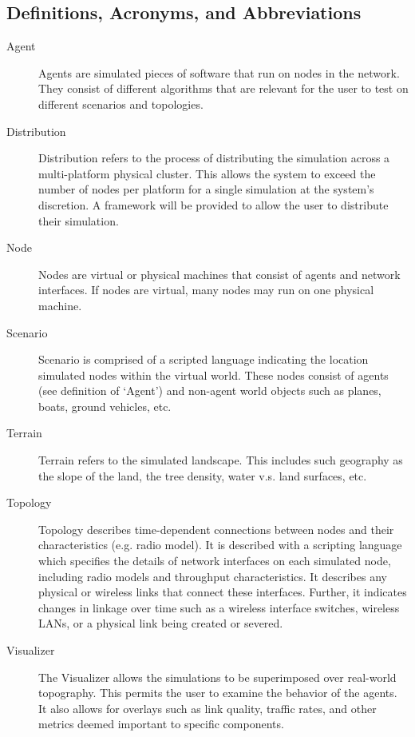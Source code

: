\documentclass[titlepage]{article}
\begin{document}
\subsection{Definitions, Acronyms, and Abbreviations%
  \label{definitions}%
}

\begin{description}
\item[Agent]
	Agents are simulated pieces of software that run on nodes in the network. They consist of different algorithms that are relevant for the user to test on different scenarios and topologies.   

\item[Distribution]
	Distribution refers to the process of distributing the simulation across a multi-platform physical cluster.  This allows the system to exceed the number of nodes per platform for a single simulation at the system's discretion.  A framework will be provided to allow the user to distribute their simulation. 	

\item[Node]
	Nodes are virtual or physical machines that consist of agents and network interfaces.  If nodes are virtual, many nodes may run on one physical machine.  

\item[Scenario]
	Scenario is comprised of a scripted language indicating the location simulated nodes within the virtual world. These nodes consist of agents (see definition of `Agent') and non-agent world objects such as planes, boats, ground vehicles, etc. 

\item[Terrain]
	Terrain refers to the simulated landscape.  This includes such geography as the slope of the land, the tree density, water v.s. land surfaces, etc.

\item[Topology]
	Topology describes time-dependent connections between nodes and their characteristics (e.g. radio model). It is described with a scripting language which specifies the details of network interfaces on each simulated node, including radio models and throughput characteristics.  It describes any physical or wireless links that connect these interfaces.  Further, it indicates changes in linkage over time such as a wireless interface switches, wireless LANs, or a physical link being created or severed. 

\item[Visualizer]
	The Visualizer allows the simulations to be superimposed over real-world topography.  This permits the user to examine the behavior of the agents.  It also allows for overlays such as link quality, traffic rates, and other metrics deemed important to specific components.

\end{description}
\end{document}
